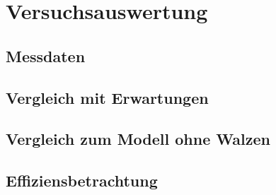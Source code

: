 \chapter{Versuchsauswertung}\label{s:auswertung}

\section{Messdaten}

\section{Vergleich mit Erwartungen}

\section{Vergleich zum Modell ohne Walzen}

\section{Effiziensbetrachtung}
